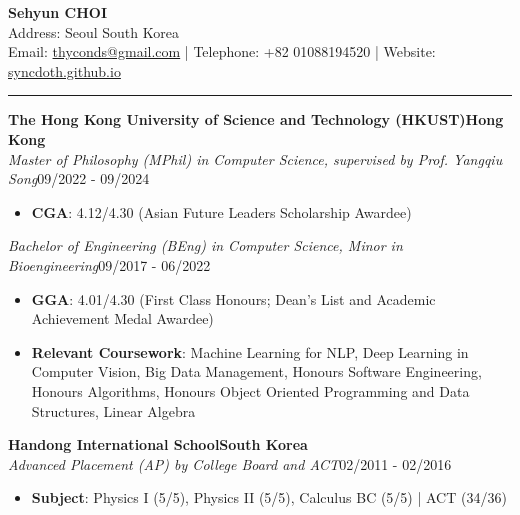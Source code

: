 \documentclass[10pt,a4paper]{article}
\newcommand{\sectiontitle}[1]{%
  \par\vspace{4pt}%
  \noindent{\bfseries\fontsize{10.3}{12}\selectfont #1}\par
  \vspace{1.5pt}\hrule\vspace{2pt}%
}
\newcommand{\eduline}[4]{\noindent\textbf{#1}\hfill\textbf{#2}\\[0.5pt]\textit{#3}\hfill #4\par\vspace{1pt}}
\begin{document}
\fontsize{9.35}{10.65}\selectfont
\begin{center}
  {\fontsize{20}{22}\selectfont\bfseries Sehyun CHOI}\\[1pt]
  Address: Seoul South Korea \\[1pt]
  Email: \href{mailto:thyconds@gmail.com}{thyconds@gmail.com} | Telephone: +82 01088194520 | Website: \href{https://syncdoth.github.io}{syncdoth.github.io}
\end{center}
\vspace{-5pt}

\sectiontitle{EDUCATION}
\eduline{The Hong Kong University of Science and Technology (HKUST)}{Hong Kong}{Master of Philosophy (MPhil) in Computer Science, supervised by Prof. Yangqiu Song}{09/2022 - 09/2024}
\begin{itemize}
  \item \textbf{CGA}: 4.12/4.30 (Asian Future Leaders Scholarship Awardee)
\end{itemize}
\textit{Bachelor of Engineering (BEng) in Computer Science, Minor in Bioengineering}\hfill 09/2017 - 06/2022
\begin{itemize}
  \item \textbf{GGA}: 4.01/4.30 (First Class Honours; Dean's List and Academic Achievement Medal Awardee)
  \item \textbf{Relevant Coursework}: Machine Learning for NLP, Deep Learning in Computer Vision, Big Data Management, Honours Software Engineering, Honours Algorithms, Honours Object Oriented Programming and Data Structures, Linear Algebra
\end{itemize}
\eduline{Handong International School}{South Korea}{Advanced Placement (AP) by College Board and ACT}{02/2011 - 02/2016}
\begin{itemize}
  \item \textbf{Subject}: Physics I (5/5), Physics II (5/5), Calculus BC (5/5) | ACT (34/36)
\end{itemize}
\end{document}
